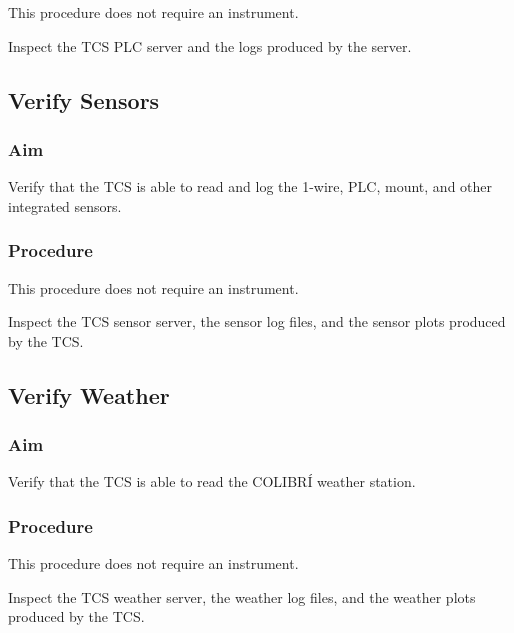 \documentclass{article}
\begin{document}
This procedure does not require an instrument.

Inspect the TCS PLC server and the logs produced by the server.


\subsection{Verify Sensors}

\subsubsection{Aim}

Verify that the TCS is able to read and log the 1-wire, PLC, mount, and other integrated sensors.

\subsubsection{Procedure}

This procedure does not require an instrument.

Inspect the TCS sensor server, the sensor log files, and the sensor plots produced by the TCS.


\subsection{Verify Weather}

\subsubsection{Aim}

Verify that the TCS is able to read the COLIBRÍ weather station.

\subsubsection{Procedure}

This procedure does not require an instrument.

Inspect the TCS weather server, the weather log files, and the weather plots produced by the TCS.

\end{document}
